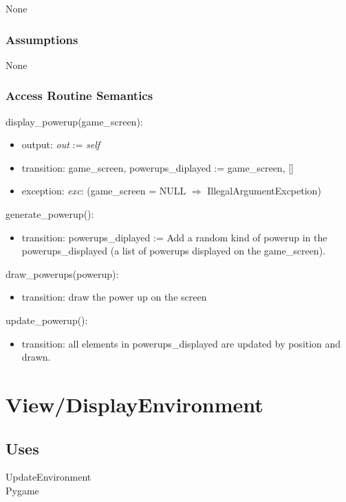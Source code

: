 \documentclass[12pt]{article}
\begin{document}
None

\subsubsection* {Assumptions}

None

\subsubsection* {Access Routine Semantics}

display\_powerup(game\_screen):
\begin{itemize}
    \item output: \textit{out} := \textit{self}
    \item transition: game\_screen, powerups\_diplayed := game\_screen, []
    \item exception: \textit{exc}: (game\_screen = NULL $\Rightarrow$ IllegalArgumentExcpetion)
\end{itemize}
\noindent generate\_powerup():
\begin{itemize}
    \item transition: powerups\_diplayed := Add a random kind of powerup in the powerups\_displayed (a list of powerups displayed on the game\_screen). 
\end{itemize}
\noindent draw\_powerups(powerup): 
\begin{itemize}
    \item transition: draw the power up on the screen
\end{itemize}

\noindent update\_powerup():
\begin{itemize}
    \item transition: all elements in powerups\_displayed are updated by position and drawn. 
\end{itemize}


\newpage
\section*{View/DisplayEnvironment}

\subsection* {Uses}
UpdateEnvironment \\
Pygame
\end{document}
